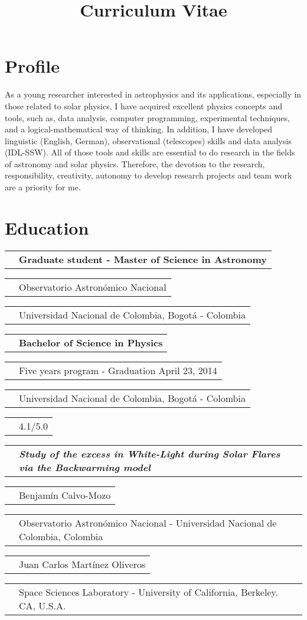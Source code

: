 \documentclass[11pt,letterpaper,sans]{moderncv}        %
\title{Curriculum Vitae}                               %
\makeatletter
\renewcommand*{\cvitem}[3][.25em]{%
  \begin{tabular}{@{}p{\hintscolumnwidth}@{\hspace{\separatorcolumnwidth}}p{\maincolumnwidth}@{}}%
      \raggedleft\hintstyle{#2} &{#3}%
  \end{tabular}%
  \par\addvspace{#1}}
\makeatother
\begin{document}
\makecvtitle

\section{Profile}
As a young researcher interested in astrophysics and its applications, especially in those related to solar physics, I have acquired excellent physics concepts and tools, such as, data analysis, computer programming, experimental techniques, and a logical-mathematical way of thinking.  In addition, I have developed linguistic (English, German), observational (telescopes) skills and data analysis (IDL-SSW). All of those tools and skills are essential to do research in the fields of astronomy and solar physics.
Therefore, the devotion to the research, responsibility, creativity, autonomy to develop research projects and team work are a priority for me. 

\section{Education}
\cvitem{Ago 2014 - present}{\textbf{Graduate student - Master of Science in Astronomy}}
\cvitem{}{Observatorio Astron\'omico Nacional}
\cvitem{}{Universidad Nacional de Colombia, Bogot\'a - Colombia}
\medskip
\cvitem{2008 - 2013}{\textbf{Bachelor of Science in Physics}}
\cvitem{}{Five years program - Graduation April 23, 2014}
\cvitem{}{Universidad Nacional de Colombia, Bogot\'a - Colombia} 
\cvitem{G.P.A.}{4.1/5.0}
\cvitem{Senior thesis}{\emph{\textbf{Study of the excess in White-Light during Solar Flares via the Backwarming model}}}
\cvitem{Supervisor}{Benjam\'{i}n Calvo-Mozo}
\cvitem{}{ Observatorio Astron\'omico Nacional - Universidad Nacional de Colombia, Colombia}
\cvitem{External}{Juan Carlos Martínez Oliveros}
\cvitem{advisor}{Space Sciences Laboratory - University of California, Berkeley. CA, U.S.A.}

\end{document}
